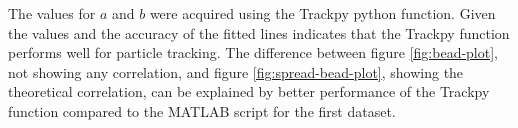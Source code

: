 The values for $a$ and $b$ were acquired using the Trackpy python function. Given the values and the accuracy of the fitted lines indicates that the Trackpy function performs well for particle tracking. The difference between figure \ref{fig:bead-plot}, not showing any correlation, and figure \ref{fig:spread-bead-plot}, showing the theoretical correlation, can be explained by better performance of the Trackpy function compared to the MATLAB script for the first dataset. 